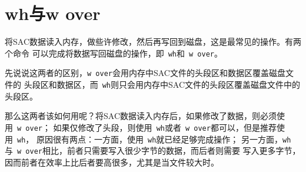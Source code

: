 \section{wh与w over}
将SAC数据读入内存，做些许修改，然后再写回到磁盘，这是最常见的操作。有两个命令
可以完成将数据写回磁盘的操作，即~\verb+wh+和~\verb+w over+。

先说说这两者的区别，\verb+w over+会用内存中SAC文件的头段区和数据区覆盖磁盘文件的
头段区和数据区，而~\verb+wh+则只会用内存中SAC文件的头段区覆盖磁盘文件中的头段区。

那么这两者该如何用呢？将SAC数据读入内存后，如果修改了数据，则必须使用~\verb+w over+；
如果仅修改了头段，则使用~\verb+wh+或者~\verb+w over+都可以，但是推荐使用~\verb+wh+，
原因很有两点：一方面，使用~\verb+wh+就已经足够完成操作；
另一方面，\verb+wh+与~\verb+w over+相比，前者只需要写入很少字节的数据，而后者则需要
写入更多字节，因而前者在效率上比后者要高很多，尤其是当文件较大时。
